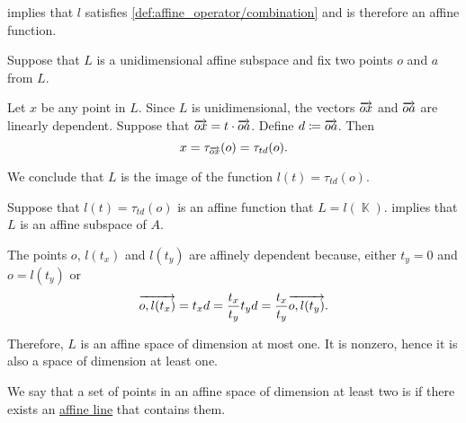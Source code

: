 \begin{defproof}
    implies that \( l \) satisfies \cref{def:affine_operator/combination} and is therefore an affine function.

   Suppose that \( L \) is a unidimensional affine subspace and fix two points \( o \) and \( a \) from \( L \).

  Let \( x \) be any point in \( L \). Since \( L \) is unidimensional, the vectors \( \overrightarrow{ox} \) and \( \overrightarrow{oa} \) are linearly dependent. Suppose that \( \overrightarrow{ox} = t \cdot \overrightarrow{oa} \). Define \( d \coloneqq \overrightarrow{oa} \). Then
  \begin{equation*}
    x = \tau_{\overrightarrow{ox}}(o) = \tau_{td}(o).
  \end{equation*}

  We conclude that \( L \) is the image of the function \( l(t) = \tau_{td}(o) \).

   Suppose that \( l(t) = \tau_{td}(o) \) is an affine function that \( L = l(\BbbK) \).  implies that \( L \) is an affine subspace of \( A \).

  The points \( o \), \( l(t_x) \) and \( l(t_y) \) are affinely dependent because, either \( t_y = 0 \) and \( o = l(t_y) \) or
  \begin{equation*}
    \overrightarrow{o,l(t_x)} = t_x d = \frac {t_x} {t_y} t_y d = \frac {t_x} {t_y} \overrightarrow{o,l(t_y)}.
  \end{equation*}

  Therefore, \( L \) is an affine space of dimension at most one. It is nonzero, hence it is also a space of dimension at least one.
\end{defproof}

\begin{definition}\label{def:collinear_points}\mimprovised
  We say that a set of points in an affine space of dimension at least two is  if there exists an \hyperref[def:affine_line]{affine line} that contains them.
\end{definition}

